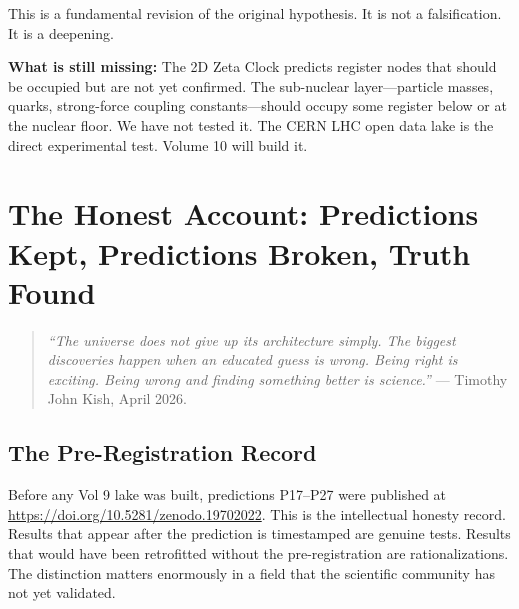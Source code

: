\documentclass[11pt, letterpaper, openany]{book}
\begin{document}
This is a fundamental revision of the original hypothesis. It is not a falsification.
It is a deepening.

\textbf{What is still missing:} The 2D Zeta Clock predicts register nodes that
should be occupied but are not yet confirmed. The sub-nuclear layer---particle
masses, quarks, strong-force coupling constants---should occupy some register below
or at the nuclear floor. We have not tested it. The CERN LHC open data lake is the
direct experimental test. Volume 10 will build it.

\clearpage

\chapter{The Honest Account: Predictions Kept, Predictions Broken, Truth Found}

\begin{quote}
\textit{``The universe does not give up its architecture simply. The biggest
discoveries happen when an educated guess is wrong. Being right is exciting.
Being wrong and finding something better is science.''} --- Timothy John Kish,
April 2026.
\end{quote}

\section{The Pre-Registration Record}

Before any Vol 9 lake was built, predictions P17--P27 were published at
\url{https://doi.org/10.5281/zenodo.19702022}. This is the intellectual honesty
record. Results that appear after the prediction is timestamped are genuine tests.
Results that would have been retrofitted without the pre-registration are
rationalizations. The distinction matters enormously in a field that the scientific
community has not yet validated.
\end{document}
